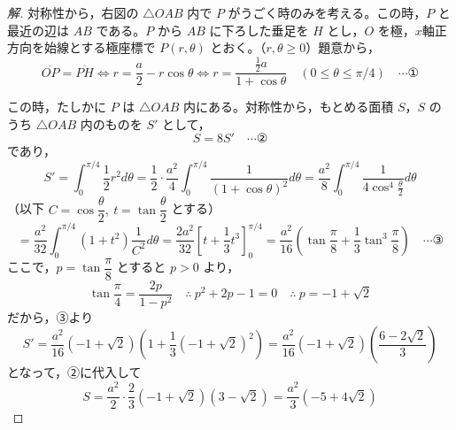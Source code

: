 \documentclass[../main.tex]{subfiles}
\begin{document}
\begin{proof}[解]
  対称性から，右図の $\triangle OAB$ 内で $P$ がうごく時のみを考える。この時，$P$ と最近の辺は $AB$ である。$P$ から $AB$ に下ろした垂足を $H$ とし，$O$ を極，$x$軸正方向を始線とする極座標で $P(r,\theta)$ とおく。（$r,\theta\ge0$）題意から，
  \[
    \overline{OP}=\overline{PH} \iff r=\frac{a}{2}-r\cos\theta \iff r=\frac{\frac12 a}{1+\cos\theta} \quad (0\le\theta\le\pi/4) \quad \cdots \text{①}
  \]

  \begin{center}
  \end{center}

  この時，たしかに $P$ は $\triangle OAB$ 内にある。対称性から，もとめる面積 $S$，$S$ のうち $\triangle OAB$ 内のものを $S'$ として，
  \[
    S=8S' \quad \cdots \text{②}
  \]
  であり，
  \[
    S'=\int_0^{\pi/4}\frac{1}{2}r^2d\theta = \frac{1}{2}\cdot\frac{a^2}{4}\int_0^{\pi/4}\frac{1}{(1+\cos\theta)^2}d\theta = \frac{a^2}{8}\int_0^{\pi/4}\frac{1}{4\cos^4\frac\theta2}d\theta
  \]
  （以下 $C=\cos\dfrac{\theta}{2},\ t=\tan\dfrac{\theta}{2}$ とする）
  \[
    =\frac{a^2}{32}\int_0^{\pi/4}(1+t^2)\frac{1}{C^2}d\theta = \frac{2a^2}{32}\left[t+\frac13t^3\right]_0^{\pi/4} = \frac{a^2}{16}\left(\tan\frac\pi8+\frac13\tan^3\frac\pi8\right) \quad \cdots \text{③}
  \]
  ここで，$p=\tan\dfrac\pi8$ とすると $p>0$ より，
  \[
    \tan\frac\pi4=\frac{2p}{1-p^2} \quad\therefore\ p^2+2p-1=0 \quad\therefore\ p=-1+\sqrt2
  \]
  だから，③より
  \[
    S'=\frac{a^2}{16}(-1+\sqrt2)\left(1+\frac13(-1+\sqrt2)^2\right) = \frac{a^2}{16}(-1+\sqrt2)\left(\frac{6-2\sqrt2}{3}\right)
  \]
  となって，②に代入して
  \[
    S=\frac{a^2}{2}\cdot\frac23(-1+\sqrt2)(3-\sqrt2) = \frac{a^2}{3}(-5+4\sqrt2)
  \]


\end{proof}
\end{document}

